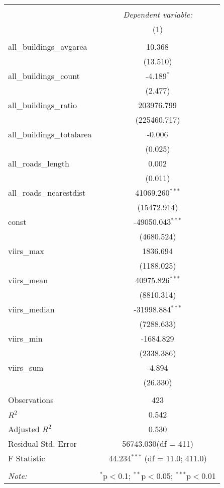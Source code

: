 \begin{table}[!htbp] \centering
\begin{tabular}{@{\extracolsep{5pt}}lc}
\\[-1.8ex]\hline
\hline \\[-1.8ex]
& \multicolumn{1}{c}{\textit{Dependent variable:}} \
\cr \cline{1-2}
\\[-1.8ex] & (1) \\
\hline \\[-1.8ex]
 all_buildings_avgarea & 10.368$^{}$ \\
  & (13.510) \\
 all_buildings_count & -4.189$^{*}$ \\
  & (2.477) \\
 all_buildings_ratio & 203976.799$^{}$ \\
  & (225460.717) \\
 all_buildings_totalarea & -0.006$^{}$ \\
  & (0.025) \\
 all_roads_length & 0.002$^{}$ \\
  & (0.011) \\
 all_roads_nearestdist & 41069.260$^{***}$ \\
  & (15472.914) \\
 const & -49050.043$^{***}$ \\
  & (4680.524) \\
 viirs_max & 1836.694$^{}$ \\
  & (1188.025) \\
 viirs_mean & 40975.826$^{***}$ \\
  & (8810.314) \\
 viirs_median & -31998.884$^{***}$ \\
  & (7288.633) \\
 viirs_min & -1684.829$^{}$ \\
  & (2338.386) \\
 viirs_sum & -4.894$^{}$ \\
  & (26.330) \\
\hline \\[-1.8ex]
 Observations & 423 \\
 $R^2$ & 0.542 \\
 Adjusted $R^2$ & 0.530 \\
 Residual Std. Error & 56743.030(df = 411)  \\
 F Statistic & 44.234$^{***}$ (df = 11.0; 411.0) \\
\hline
\hline \\[-1.8ex]
\textit{Note:} & \multicolumn{1}{r}{$^{*}$p$<$0.1; $^{**}$p$<$0.05; $^{***}$p$<$0.01} \\
\end{tabular}
\end{table}